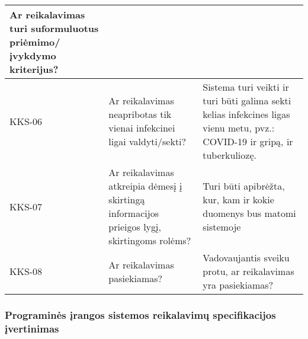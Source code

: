 \documentclass{VUMIFPSkursinis}
\begin{document}
\begin{center}
\begin{longtable}{|C{2cm}|L{5cm}|L{8cm}|}
		Ar reikalavimas turi suformuluotus priėmimo/įvykdymo kriterijus?
		\\ \hline
		KKS-06                                                                                       &
		Ar reikalavimas neapribotas tik vienai infekcinei ligai valdyti/sekti?                       &
		Sistema turi veikti ir turi būti galima sekti kelias infekcines ligas vienu metu, pvz.: COVID-19 ir gripą, ir tuberkuliozę.
		\\ \hline
		KKS-07                                                                                       &
		Ar reikalavimas atkreipia dėmesį į skirtingą informacijos prieigos lygį, skirtingoms rolėms? &
		Turi būti apibrėžta, kur, kam ir kokie duomenys bus matomi sistemoje
		\\ \hline
		KKS-08                                                                                       &
		Ar reikalavimas pasiekiamas?                                                                 &
		Vadovaujantis sveiku protu, ar reikalavimas yra pasiekiamas?
		\\ \hline
	\end{longtable}
\end{center}


\subsubsection{Programinės įrangos sistemos reikalavimų specifikacijos įvertinimas}
\end{document}
